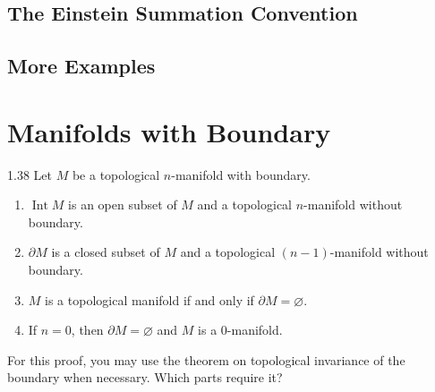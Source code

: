 \subsection{The Einstein Summation Convention}

\subsection{More Examples}

\section{Manifolds with Boundary}

\begin{prop}{1.38}
    Let \( M \) be a topological \( n \)-manifold with boundary.
    \begin{enumerate}[itemsep=0pt,label={(\alph*)}]
        \item \( \operatorname{Int} M \) is an open subset of \( M \) and a topological \( n \)-manifold without boundary.
        \item \( \partial M \) is a closed subset of \( M \) and a topological \( (n - 1) \)-manifold without boundary.
        \item \( M \) is a topological manifold if and only if \( \partial M = \varnothing \).
        \item If \( n = 0 \), then \( \partial M = \varnothing \) and \( M \) is a \( 0 \)-manifold.
    \end{enumerate}

    For this proof, you may use the theorem on topological invariance of the boundary when necessary. Which parts require it?
\end{prop}

